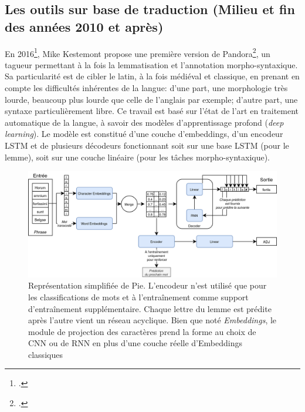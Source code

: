\subsection{Les outils sur base de traduction (Milieu et fin des années 2010 et après)}

En 2016\footcite{kestemont_initial_2016}, Mike Kestemont propose une première version de Pandora\footcite{kestemont_lemmatization_2017}, un tagueur permettant à la fois la lemmatisation et l'annotation morpho-syntaxique. Sa particularité est de cibler le latin, à la fois médiéval et classique, en prenant en compte les difficultés inhérentes de la langue: d'une part, une morphologie très lourde, beaucoup plus lourde que celle de l'anglais par exemple; d'autre part, une syntaxe particulièrement libre. Ce travail est basé sur l'état de l'art en traitement automatique de la langue, à savoir des modèles d'apprentissage profond (\textit{deep learning}). Le modèle est constitué d'une couche d'embeddings, d'un encodeur LSTM et de plusieurs décodeurs fonctionnant soit sur une base LSTM (pour le lemme), soit sur une couche linéaire (pour les tâches morpho-syntaxique).


\begin{figure}[h]
    \centering
    \includegraphics[width=\linewidth]{results/lemmatisation/outils/Pie.png}
    \caption{Représentation simplifiée de Pie. L'encodeur n'est utilisé que pour les classifications de mots et à l'entraînement comme support d'entraînement supplémentaire. Chaque lettre du lemme est prédite après l'autre vient un réseau acyclique. Bien que noté \textit{Embeddings}, le module de projection des caractères prend la forme au choix de CNN ou de RNN en plus d'une couche réelle d'Embeddings classiques}
    \label{lemmatisation:outils:pie}
\end{figure}

